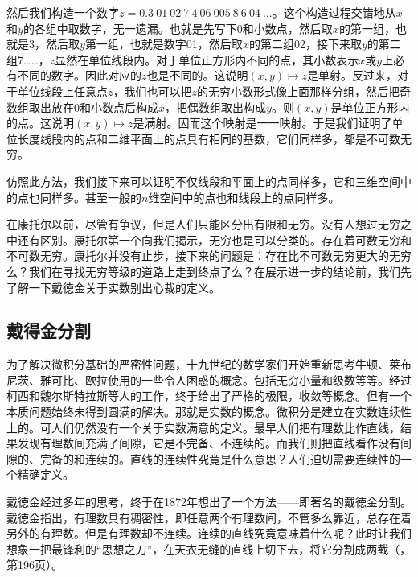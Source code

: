 \documentclass{article}
\begin{document}
然后我们构造一个数字$ z = 0.3\ 01\ 02\ 7\ 4\ 06\ 005\ 8\ 6\ 04\ ...$。这个构造过程交错地从$x$和$y$的各组中取数字，无一遗漏。也就是先写下0和小数点，然后取$x$的第一组，也就是3，然后取$y$第一组，也就是数字01，然后取$x$的第二组02，接下来取$y$的第二组7……，$z$显然在单位线段内。对于单位正方形内不同的点，其小数表示$x$或$y$上必有不同的数字。因此对应的$z$也是不同的。这说明$(x, y) \mapsto z$是单射。反过来，对于单位线段上任意点$z$，我们也可以把$z$的无穷小数形式像上面那样分组，然后把奇数组取出放在0和小数点后构成$x$，把偶数组取出构成$y$。则$(x, y)$是单位正方形内的点。这说明$(x, y) \mapsto z$是满射。因而这个映射是一一映射。于是我们证明了单位长度线段内的点和二维平面上的点具有相同的基数，它们同样多，都是不可数无穷。

仿照此方法，我们接下来可以证明不仅线段和平面上的点同样多，它和三维空间中的点也同样多。甚至一般的$n$维空间中的点也和线段上的点同样多。

在康托尔以前，尽管有争议，但是人们只能区分出有限和无穷。没有人想过无穷之中还有区别。康托尔第一个向我们揭示，无穷也是可以分类的。存在着可数无穷和不可数无穷。康托尔并没有止步，接下来的问题是：存在比不可数无穷更大的无穷么？我们在寻找无穷等级的道路上走到终点了么？在展示进一步的结论前，我们先了解一下戴徳金关于实数别出心裁的定义。

\begin{Exercise}
\end{Exercise}

\subsection{戴得金分割}
为了解决微积分基础的严密性问题，十九世纪的数学家们开始重新思考牛顿、莱布尼茨、雅可比、欧拉使用的一些令人困惑的概念。包括无穷小量和级数等等。经过柯西和魏尔斯特拉斯等人的工作，终于给出了严格的极限，收敛等概念。但有一个本质问题始终未得到圆满的解决。那就是实数的概念。微积分是建立在实数连续性上的。可人们仍然没有一个关于实数满意的定义。最早人们把有理数比作直线，结果发现有理数间充满了间隙，它是不完备、不连续的。而我们则把直线看作没有间隙的、完备的和连续的。直线的连续性究竟是什么意思？人们迫切需要连续性的一个精确定义。

戴徳金经过多年的思考，终于在1872年想出了一个方法——即著名的戴徳金分割。戴徳金指出，有理数具有稠密性，即任意两个有理数间，不管多么靠近，总存在着另外的有理数。但是有理数却不连续。连续的直线究竟意味着什么呢？此时让我们想象一把最锋利的“思想之刀”，在天衣无缝的直线上切下去，将它分割成两截（\cite{HanXueTao16}，第196页）。
\end{document}
